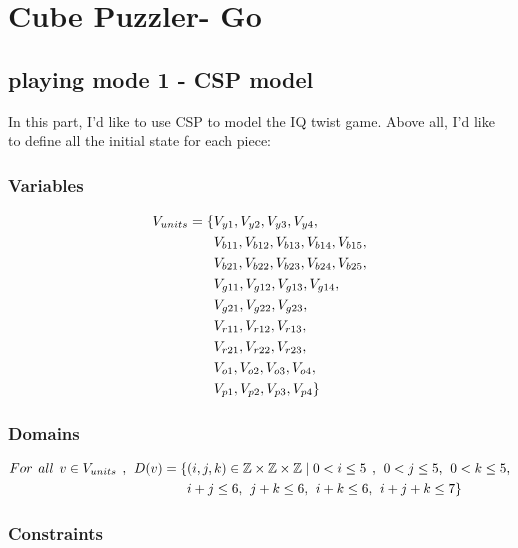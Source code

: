 \chapter{Cube Puzzler- Go}
\section{playing mode 1 - CSP model}
\label{sec:CSP model}
In this part, I'd like to use CSP to model the IQ twist game. Above all, I'd like to define all the initial state for each piece:
\subsection{Variables}
\begin{align*}
V_{units}=\{&V_{y1},V_{y2},V_{y3},V_{y4},\\&V_{b11},V_{b12},V_{b13},V_{b14},
V_{b15},\\&V_{b21},V_{b22},V_{b23},V_{b24},V_{b25},\\&V_{g11},V_{g12},V_{g13},V_{g14},\\&V_{g21},V_{g22},V_{g23},\\&V_{r11},
V_{r12},V_{r13},\\&V_{r21},V_{r22},V_{r23},\\&V_{o1},V_{o2},V_{o3},V_{o4},\\&V_{p1},V_{p2},V_{p3},V_{p4}\}
\end{align*}
\subsection{Domains}
\begin{align*}
For \hspace{1ex} all \hspace{1ex} v \in V_{units} \hspace{1ex},\hspace{1ex} D(v)=\{&(i,j,k) \in \mathbb{Z} \times \mathbb{Z}	\times \mathbb{Z} \mid  0<i \leq 5 \hspace{1ex} , \hspace{1ex} 0<j \leq 5,\hspace{1ex} 0<k \leq 5,\\& i+j\leq 6,\hspace{1ex} j+k\leq 6,\hspace{1ex}i+k\leq 6,\hspace{1ex}i+j+k\leq 7\}
\end{align*}
\subsection{Constraints}

